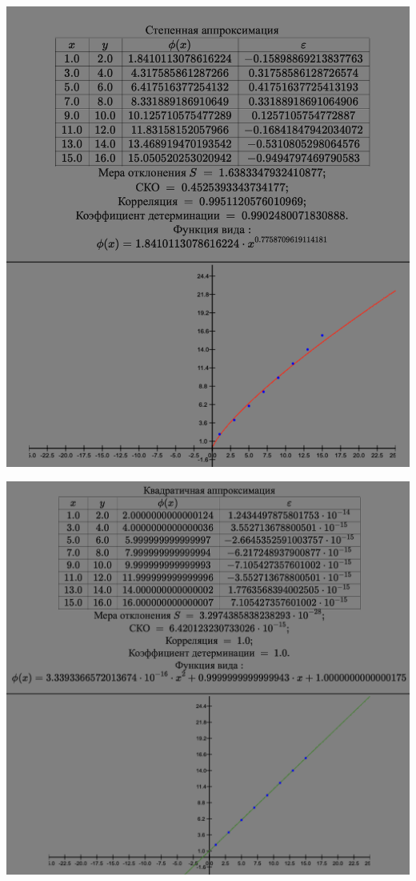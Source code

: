 \documentclass{article}
\begin{document}
\begin{center}
    \includegraphics[width=.7\textwidth]{pow.png}
\end{center}
\begin{center}
    \includegraphics[width=.7\textwidth]{quad.png}
\end{center}
\end{document}
